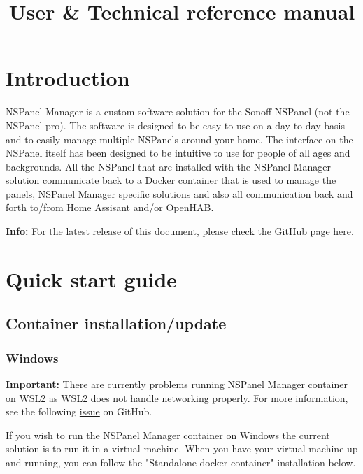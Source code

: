 \documentclass[10pt]{article}
\title{User \& Technical reference manual} %
\author{} %
\date{} %
\newcommand{\info}[1]{\begin{infoBox} \textbf{Info:} #1 \end{infoBox}}
\newcommand{\important}[1]{\begin{importantBox} \textbf{Important:} #1 \end{importantBox}}
\begin{document}
    \maketitle %

    \clearpage
    \tableofcontents
    \clearpage
    \section{Introduction} %
    NSPanel Manager is a custom software solution for the Sonoff NSPanel (not the NSPanel pro). The software is designed to be easy to use on a day to day basis and to easily manage multiple NSPanels around your home.
    The interface on the NSPanel itself has been designed to be intuitive to use for people of all ages and backgrounds.
    \bigbreak
    All the NSPanel that are installed with the NSPanel Manager solution communicate back to a Docker container that is used to manage the panels, NSPanel Manager specific solutions and also all communication back and forth to/from Home Assisant and/or OpenHAB.
    \bigbreak
    \info{For the latest release of this document, please check the GitHub page \href{https://github.com/NSPManager/NSPanelManager}{here}.}

    \clearpage
    \section{Quick start guide}
    \subsection{Container installation/update}
    \subsubsection{Windows}
    \important{There are currently problems running NSPanel Manager container on WSL2 as WSL2 does not handle networking properly. For more information, see the following \href{https://github.com/microsoft/WSL/issues/4150}{issue} on GitHub.}
    If you wish to run the NSPanel Manager container on Windows the current solution is to run it in a virtual machine. When you have your virtual machine up and running, you can follow the "Standalone docker container" installation below.
\end{document}

